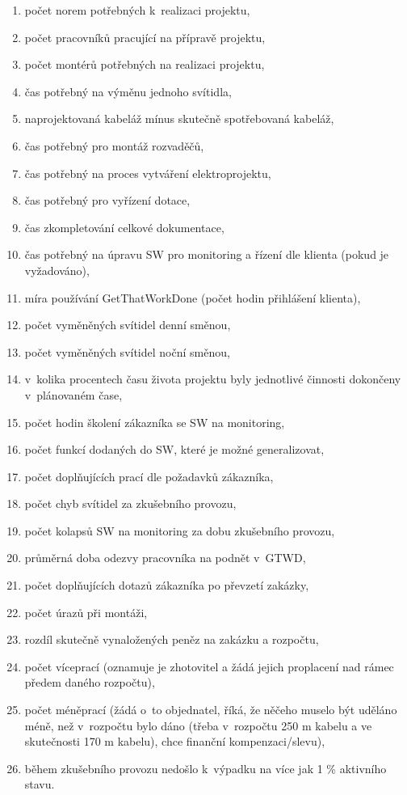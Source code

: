 \documentclass[a4paper, twoside, 11pt]{article}
\begin{document}
		\begin{enumerate}
			\item počet norem potřebných k~realizaci projektu,
			\item počet pracovníků pracující na přípravě projektu,
			\item počet montérů potřebných na realizaci projektu,
			\item čas potřebný na výměnu jednoho svítidla,
			\item naprojektovaná kabeláž mínus skutečně spotřebovaná kabeláž,
			\item čas potřebný pro montáž rozvaděčů,
			\item čas potřebný na proces vytváření elektroprojektu,
			\item čas potřebný pro vyřízení dotace,
			\item čas zkompletování celkové dokumentace,
			\item čas potřebný na úpravu SW pro monitoring a řízení dle klienta (pokud je vyžadováno),
			\item míra používání GetThatWorkDone (počet hodin přihlášení klienta),
			\item počet vyměněných svítidel denní směnou,
			\item počet vyměněných svítidel noční směnou,
			\item v~kolika procentech času života projektu byly jednotlivé činnosti dokončeny v~plánovaném čase,
			\item počet hodin školení zákazníka se SW na monitoring,
			\item počet funkcí dodaných do SW, které je možné generalizovat,
			\item počet doplňujících prací dle požadavků zákazníka,
			\item počet chyb svítidel za zkušebního provozu,
			\item počet kolapsů SW na monitoring za dobu zkušebního provozu,
			\item průměrná doba odezvy pracovníka na podnět v~GTWD,
			\item počet doplňujících dotazů zákazníka po převzetí zakázky,
			\item počet úrazů při montáži,
			\item rozdíl skutečně vynaložených peněz na zakázku a rozpočtu,
			\item počet víceprací (oznamuje je zhotovitel a žádá jejich proplacení nad rámec předem daného rozpočtu),
			\item počet méněprací (žádá o~to objednatel, říká, že něčeho muselo být uděláno méně, než v~rozpočtu bylo dáno (třeba v~rozpočtu 250 m kabelu a ve skutečnosti 170 m kabelu), chce finanční kompenzaci/slevu),
			\item během zkušebního provozu nedošlo k~výpadku na více jak 1 \% aktivního stavu.
			
			
		\end{enumerate}
\end{document}
